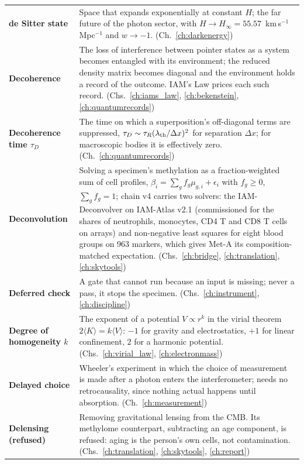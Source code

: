{\begin{longtable}{@{}>{\raggedright\arraybackslash}p{}>{\raggedright\arraybackslash}p{}@{}}
\textbf{de Sitter state} & Space that expands exponentially at constant $H$; the far future of the photon sector, with $H\to H_\infty=55.57$~km\,s$^{-1}$\,Mpc$^{-1}$ and $w\to-1$. {\footnotesize(Ch.~\ref{ch:darkenergy})}\\[1pt]
\textbf{Decoherence} & The loss of interference between pointer states as a system becomes entangled with its environment; the reduced density matrix becomes diagonal and the environment holds a record of the outcome. IAM's Law prices each such record. {\footnotesize(Chs.~\ref{ch:iams_law}, \ref{ch:bekenstein}, \ref{ch:quantumrecords})}\\[1pt]
\textbf{Decoherence time $\tau_D$} & The time on which a superposition's off-diagonal terms are suppressed, $\tau_D\sim\tau_R(\lambda_{\rm th}/\Delta x)^2$ for separation $\Delta x$; for macroscopic bodies it is effectively zero. {\footnotesize(Ch.~\ref{ch:quantumrecords})}\\[1pt]
\textbf{Deconvolution} & Solving a specimen's methylation as a fraction-weighted sum of cell profiles, $\beta_i=\sum_gf_g\mu_{g,i}+\epsilon_i$ with $f_g\ge0$, $\sum_gf_g=1$; chain v4 carries two solvers: the IAM-Deconvolver on IAM-Atlas v2.1 (commissioned for the shares of neutrophils, monocytes, CD4 T and CD8 T cells on arrays) and non-negative least squares for eight blood groups on 963 markers, which gives Met-A its composition-matched expectation. {\footnotesize(Chs.~\ref{ch:bridge}, \ref{ch:translation}, \ref{ch:skytools})}\\[1pt]
\textbf{Deferred check} & A gate that cannot run because an input is missing; never a pass, it stops the specimen. {\footnotesize(Chs.~\ref{ch:instrument}, \ref{ch:discipline})}\\[1pt]
\textbf{Degree of homogeneity $k$} & The exponent of a potential $V\propto r^k$ in the virial theorem $2\langle K\rangle=k\langle V\rangle$: $-1$ for gravity and electrostatics, $+1$ for linear confinement, $2$ for a harmonic potential. {\footnotesize(Chs.~\ref{ch:virial_law}, \ref{ch:electronmass})}\\[1pt]
\textbf{Delayed choice} & Wheeler's experiment in which the choice of measurement is made after a photon enters the interferometer; needs no retrocausality, since nothing actual happens until absorption. {\footnotesize(Ch.~\ref{ch:measurement})}\\[1pt]
\textbf{Delensing (refused)} & Removing gravitational lensing from the CMB. Its methylome counterpart, subtracting an age component, is refused: aging is the person's own cells, not contamination. {\footnotesize(Chs.~\ref{ch:translation}, \ref{ch:skytools}, \ref{ch:report})}\\[1pt]

\end{longtable}}
